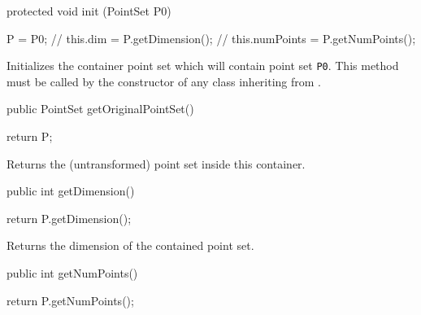 \begin{code}

   protected void init (PointSet P0) \begin{hide} {
      P = P0;
//      this.dim = P.getDimension();
//      this.numPoints = P.getNumPoints();
   }\end{hide}
\end{code}
 \begin{tabb}
   Initializes the container point set which will contain point set \texttt{P0}.
   This method must be called by the constructor of any class inheriting from
   .
 \end{tabb}
\begin{htmlonly}
\end{htmlonly}
\begin{code}

   public PointSet getOriginalPointSet() \begin{hide} {
      return P;
   }\end{hide}
\end{code}
\begin{tabb}
   Returns the (untransformed) point set inside this container.
\end{tabb}
\begin{htmlonly}
\end{htmlonly}
\begin{code}

   public int getDimension() \begin{hide} {
      return P.getDimension();
   }\end{hide}
\end{code}
\begin{tabb}
   Returns the dimension of the contained point set.
\end{tabb}
\begin{htmlonly}
\end{htmlonly}
\begin{code}

   public int getNumPoints()\begin{hide} {
      return P.getNumPoints();
   }\end{hide}
\end{code}
